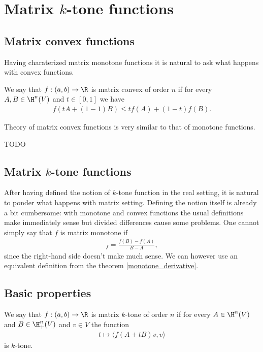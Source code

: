 \chapter{Matrix $k$-tone functions}

\section{Matrix convex functions}

Having charaterized matrix monotone functions it is natural to ask what happens with convex functions.

\begin{maar}
	We say that $f : (a, b) \to \R$ is matrix convex of order $n$ if for every $A, B \in \H^{n}(V)$ and $t \in [0, 1]$ we have
	\begin{align*}
		f(t A + (1 - 1) B) \leq t f(A) + (1 - t) f(B).
	\end{align*}
\end{maar}

Theory of matrix convex functions is very similar to that of monotone functions.

TODO

\section{Matrix $k$-tone functions}

After having defined the notion of $k$-tone function in the real setting, it is natural to ponder what happens with matrix setting. Defining the notion itself is already a bit cumbersome: with monotone and convex functions the usual definitions make immediately sense but divided differences cause some problems. One cannot simply say that $f$ is matrix monotone if
\begin{align*}
	[A, B]_{f} = \frac{f(B) - f(A)}{B - A},
\end{align*}
since the right-hand side doesn't make much sense. We can however use an equivalent definition from the theorem \ref{monotone_derivative}.

\section{Basic properties}

\begin{maar}
	We say that $f : (a, b) \to \R$ is matrix $k$-tone of order $n$ if for every $A \in \H^{n}(V)$ and $B \in \H^{n}_{+}(V)$ and $v \in V$ the function
	\begin{align*}
		t \mapsto \langle f(A + t B) v, v \rangle
	\end{align*}
	is $k$-tone.
\end{maar}

